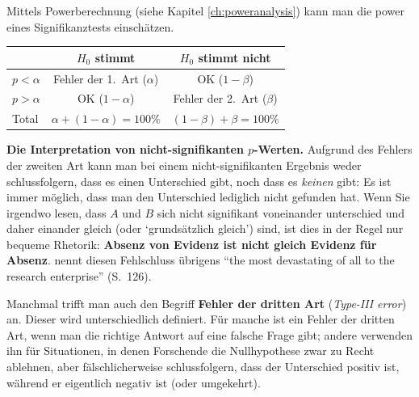 \documentclass[oneside, 10pt]{book}\usepackage[]{graphicx}\usepackage[]{xcolor}
\begin{document}
Mittels Powerberechnung (siehe Kapitel \ref{ch:poweranalysis}) kann man die power eines Signifikanztests einschätzen.
\medskip
\begin{center}
\begin{tabular}{lcc}
\toprule
 & $H_0$ stimmt & $H_0$ stimmt nicht\\
\midrule
$p<\alpha$ & Fehler der 1.\ Art ($\alpha$) & OK ($1-\beta$)\\
$p>\alpha$ & OK ($1 - \alpha$) & Fehler der 2.\ Art ($\beta$)\\
\midrule
Total      & $\alpha + (1 - \alpha) = 100\%$            & $(1 - \beta) + \beta = 100\%$\\
\bottomrule
\end{tabular}
\end{center}
\bigskip

\begin{framed}
\textbf{Die Interpretation von nicht-signifikanten $p$-Werten.}
Aufgrund des Fehlers der zweiten Art kann man bei einem nicht-signifikanten
Ergebnis weder schlussfolgern, dass es einen Unterschied gibt, noch
dass es \emph{keinen} gibt: Es ist immer möglich, dass man den Unterschied
lediglich nicht gefunden hat. Wenn Sie irgendwo lesen, dass $A$ und $B$
sich nicht signifikant voneinander unterschied und daher einander gleich
(oder `grundsätzlich gleich') sind, ist dies in der Regel nur bequeme
Rhetorik: \textbf{Absenz von Evidenz ist nicht gleich Evidenz für Absenz}.
\citet{Schmidt1996} nennt diesen Fehlschluss übrigens ``the most devastating
of all to the research enterprise'' (S.~126).
\end{framed}

\bigskip

Manchmal trifft man auch den Begriff
\textbf{Fehler der dritten Art} (\textit{Type-III error}) an.
Dieser wird unterschiedlich definiert. Für manche ist ein
Fehler der dritten Art, wenn man die richtige Antwort auf
eine falsche Frage gibt; andere verwenden ihn für Situationen,
in denen Forschende die Nullhypothese zwar zu Recht ablehnen,
aber fälschlicherweise schlussfolgern, dass der Unterschied
positiv ist, während er eigentlich negativ ist (oder umgekehrt).
\end{document}
